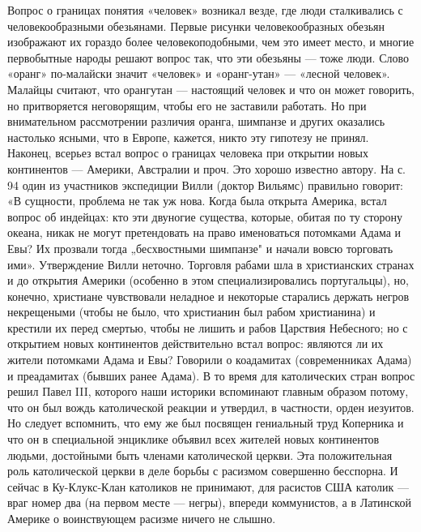 Вопрос   о   границах   понятия    «человек»   возникал   везде,   где
люди    сталкивались    с   человекообразными    обезьянами.    Первые
рисунки   человекообразных  обезьян   изображают   их  гораздо   более
человекоподобными, чем  это имеет  место, и многие  первобытные народы
решают  вопрос так,  что эти  обезьяны  --- тоже  люди. Слово  «оранг»
по-малайски  значит «человек»  и  «оранг-утан»  --- «лесной  человек».
Малайцы  считают,  что  орангутан  ---  настоящий  человек  и  что  он
может говорить,  но притворяется  неговорящим, чтобы его  не заставили
работать. Но при внимательном рассмотрении различия оранга, шимпанзе и
других оказались  настолько ясными, что  в Европе, кажется,  никто эту
гипотезу не принял. Наконец, всерьез  встал вопрос о границах человека
при  открытии новых  континентов ---  Америки, Австралии  и проч.  Это
хорошо известно автору.  На с. 94 один из  участников экспедиции Вилли
(доктор Вильямс)  правильно говорит: «В  сущности, проблема не  так уж
нова. Когда  была открыта Америка,  встал вопрос об индейцах:  кто эти
двуногие  существа, которые,  обитая по  ту сторону  океана, никак  не
могут  претендовать на  право именоваться  потомками Адама  и Евы?  Их
прозвали  тогда  „бесхвостными  шимпанзе"  и  начали  вовсю  торговать
ими». Утверждение  Вилли неточно.  Торговля рабами шла  в христианских
странах  и до  открытия  Америки (особенно  в этом  специализировались
португальцы), но, конечно, христиане  чувствовали неладное и некоторые
старались держать  негров некрещеными  (чтобы не было,  что христианин
был  рабом  христианина)  и  крестили   их  перед  смертью,  чтобы  не
лишить и  рабов Царствия Небесного;  но с открытием  новых континентов
действительно встал  вопрос: являются ли  их жители потомками  Адама и
Евы? Говорили о коадамитах (современниках Адама) и преадамитах (бывших
ранее Адама).  В то  время для католических  стран вопрос  решил Павел
III,  которого наши  историки вспоминают  главным образом  потому, что
он  был вождь  католической  реакции и  утвердил,  в частности,  орден
иезуитов. Но  следует вспомнить,  что ему  же был  посвящен гениальный
труд Коперника и  что он в специальной энциклике  объявил всех жителей
новых континентов людьми, достойными быть членами католической церкви.
Эта положительная  роль католической церкви  в деле борьбы  с расизмом
совершенно бесспорна. И сейчас в Ку-Клукс-Клан католиков не принимают,
для  расистов США  католик ---  враг номер  два (на  первом месте  ---
негры),  впереди коммунистов,  а  в Латинской  Америке о  воинствующем
расизме ничего не слышно.

